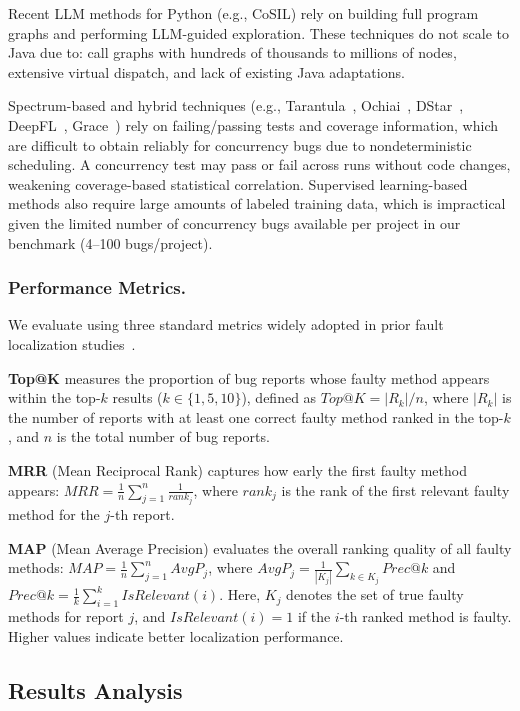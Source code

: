 Recent LLM  methods for Python (e.g., CoSIL) rely on building full program graphs and performing LLM-guided exploration. These techniques do not scale to Java due to: call graphs with hundreds of thousands to millions of nodes,	extensive virtual dispatch, and lack of existing Java adaptations.

Spectrum-based and hybrid techniques (e.g., Tarantula~\cite{Tarantula}, Ochiai~\cite{abreu2009practical}, DStar~\cite{dst}, DeepFL~\cite{dl1}, Grace~\cite{dl2}) rely on failing/passing tests and coverage information, which are difficult to obtain reliably for concurrency bugs due to nondeterministic scheduling. A concurrency test may pass or fail across runs without code changes, weakening coverage-based statistical correlation. Supervised learning-based methods also require large amounts of labeled training data, which is impractical given the limited number of concurrency bugs available per project in our benchmark (4--100 bugs/project).

\subsubsection{Performance Metrics.}

We evaluate \Name{} using three standard metrics widely adopted in prior fault localization studies~\cite{flexfl, autofl,yu2008empirical,jones2005empirical,chilimbi2009holmes,santelices2009lightweight}.

\textbf{Top@K} measures the proportion of bug reports whose faulty method appears within the top-$k$ results ($k\!\in\!\{1,5,10\}$), defined as
$Top@K = |R_k| / n$, where $|R_k|$ is the number of reports with at least one correct faulty method ranked in the top-$k$, and $n$ is the total number of bug reports.

\textbf{MRR} (Mean Reciprocal Rank) captures how early the first faulty method appears:
$MRR = \frac{1}{n}\sum_{j=1}^{n} \frac{1}{rank_j}$,
where $rank_j$ is the rank of the first relevant faulty method for the $j$-th report.

\textbf{MAP} (Mean Average Precision) evaluates the overall ranking quality of all faulty methods:
$MAP = \frac{1}{n}\sum_{j=1}^{n} AvgP_j$,
where $AvgP_j = \frac{1}{|K_j|}\sum_{k\in K_j} Prec@k$ and
$Prec@k = \frac{1}{k}\sum_{i=1}^{k} IsRelevant(i)$.
Here, $K_j$ denotes the set of true faulty methods for report $j$, and $IsRelevant(i)=1$ if the $i$-th ranked method is faulty. Higher values indicate better localization performance.


\subsection{Results Analysis}





